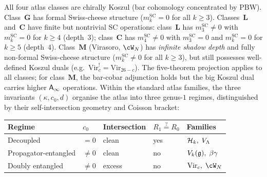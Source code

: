 \begin{theorem}
All four atlas classes are chirally Koszul (bar cohomology
concentrated by PBW). Class~$\mathbf{G}$ has formal Swiss-cheese structure
($m_k^{\mathrm{SC}} = 0$ for all $k \ge 3$).
Classes~$\mathbf{L}$ and~$\mathbf{C}$ have finite but
nontrivial SC operations: class~$\mathbf{L}$ has
$m_3^{\mathrm{SC}} \ne 0$ with $m_k^{\mathrm{SC}} = 0$ for
$k \ge 4$ (depth~$3$); class~$\mathbf{C}$ has
$m_4^{\mathrm{SC}} \ne 0$ with $m_3^{\mathrm{SC}} = 0$ and
$m_k^{\mathrm{SC}} = 0$ for $k \ge 5$ (depth~$4$).
Class~$\mathbf{M}$ (Virasoro, $\cW_N$) has \emph{infinite
shadow depth} and fully non-formal Swiss-cheese structure
($m_k^{\mathrm{SC}} \ne 0$ for all $k \ge 3$), but still
possesses well-defined Koszul duals
(e.g.\ $\mathrm{Vir}_c^! = \mathrm{Vir}_{26-c}$). The
five-theorem projection applies to all classes; for
class~$\mathbf{M}$, the bar-cobar adjunction holds but the
big Koszul dual carries higher $\mathsf{A}_{\infty}$ operations.
Within the standard atlas families, the three
invariants $(\kappa, c_0, d)$ organise the atlas into three
genus-$1$ regimes, distinguished by their self-intersection
geometry and Coisson bracket:
\begin{center}
\small
\renewcommand{\arraystretch}{1.3}
\begin{tabular}{lllll}
\toprule
\textbf{Regime} & $c_0$ & \textbf{Intersection}
 & $R_1 \stackrel{?}{=} R_0$ & \textbf{Families} \\
\midrule
Decoupled & $= 0$ & clean
 & yes & $\mathcal{H}_k,\; V_\Lambda$ \\
Propagator-entangled & $\ne 0$ & clean
 & no & $V_k(\mathfrak{g}),\; \beta\gamma$ \\
Doubly entangled & $\ne 0$ & excess
 & no & $\mathrm{Vir}_c,\; \cW_N$ \\
\bottomrule
\end{tabular}
\end{center}
\end{theorem}

